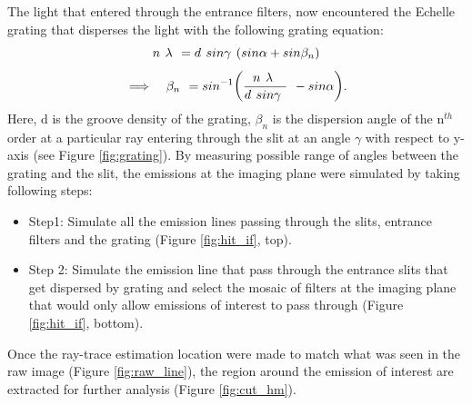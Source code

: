 \documentclass[crop=false,class=mitthesis,oneside,font=12pt]{standalone}
\begin{document}
The light that entered through the entrance filters, now encountered the Echelle grating that disperses the light with the following grating equation:
\begin{equation*}
\large
{n~\lambda~=d~sin\gamma~(sin\alpha + sin\beta_n)}
\end{equation*}
\begin{equation}
\large
\implies~~\beta_n~=sin^{-1}\Big(\frac{n~\lambda~}{d~sin\gamma~}~-sin\alpha\Big).
\end{equation}
Here, d is the groove density of the grating, $\beta_n$ is the dispersion angle of the n$^{th}$ order at a particular ray entering through the slit at an angle $\gamma$ with respect to y-axis (see Figure \ref{fig:grating}). By measuring possible range of angles between the grating and the slit, the emissions at the imaging plane were simulated by taking following steps:
\begin{itemize}
\item Step1: Simulate all the emission lines passing through the slits, entrance filters and the grating (Figure \ref{fig:hit_if}, top). 
\item Step 2: Simulate the emission line that pass through the entrance slits that get dispersed by grating and select the mosaic of filters at the imaging plane that would only allow emissions of interest to pass through (Figure \ref{fig:hit_if}, bottom).
\end{itemize}
Once the ray-trace estimation location were made to match what was seen in the raw image (Figure \ref{fig:raw_line}), the region around the emission of interest are extracted for further analysis (Figure \ref{fig:cut_hm}). 
\end{document}
